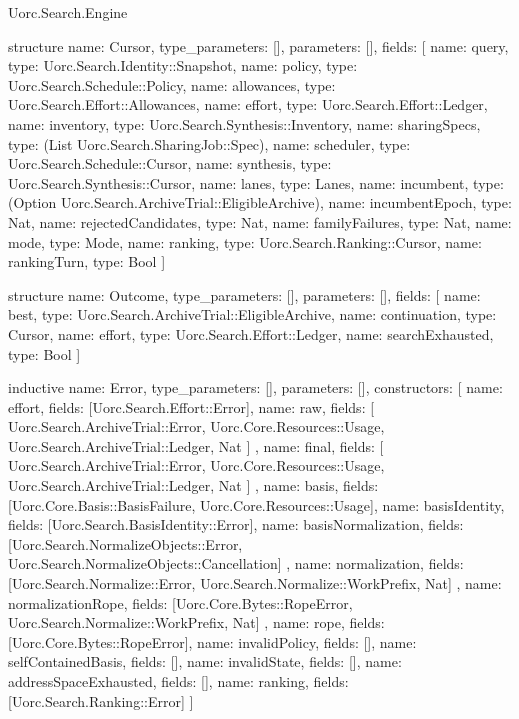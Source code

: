 \begin{lexlean}{Uorc.Search.Engine}
\begin{semanticmodule}
structure{
  name: Cursor,
  type_parameters: [],
  parameters: [],
  fields: [
    {name: query, type: Uorc.Search.Identity::Snapshot},
    {name: policy, type: Uorc.Search.Schedule::Policy},
    {name: allowances, type: Uorc.Search.Effort::Allowances},
    {name: effort, type: Uorc.Search.Effort::Ledger},
    {name: inventory, type: Uorc.Search.Synthesis::Inventory},
    {name: sharingSpecs, type: (List Uorc.Search.SharingJob::Spec)},
    {name: scheduler, type: Uorc.Search.Schedule::Cursor},
    {name: synthesis, type: Uorc.Search.Synthesis::Cursor},
    {name: lanes, type: Lanes},
    {name: incumbent, type: (Option Uorc.Search.ArchiveTrial::EligibleArchive)},
    {name: incumbentEpoch, type: Nat},
    {name: rejectedCandidates, type: Nat},
    {name: familyFailures, type: Nat},
    {name: mode, type: Mode},
    {name: ranking, type: Uorc.Search.Ranking::Cursor},
    {name: rankingTurn, type: Bool}
  ]
}

structure{
  name: Outcome,
  type_parameters: [],
  parameters: [],
  fields: [
    {name: best, type: Uorc.Search.ArchiveTrial::EligibleArchive},
    {name: continuation, type: Cursor},
    {name: effort, type: Uorc.Search.Effort::Ledger},
    {name: searchExhausted, type: Bool}
  ]
}

inductive{
  name: Error,
  type_parameters: [],
  parameters: [],
  constructors: [
    {name: effort, fields: [Uorc.Search.Effort::Error]},
    {
      name: raw,
      fields: [
        Uorc.Search.ArchiveTrial::Error,
        Uorc.Core.Resources::Usage,
        Uorc.Search.ArchiveTrial::Ledger,
        Nat
      ]
    },
    {
      name: final,
      fields: [
        Uorc.Search.ArchiveTrial::Error,
        Uorc.Core.Resources::Usage,
        Uorc.Search.ArchiveTrial::Ledger,
        Nat
      ]
    },
    {name: basis, fields: [Uorc.Core.Basis::BasisFailure, Uorc.Core.Resources::Usage]},
    {name: basisIdentity, fields: [Uorc.Search.BasisIdentity::Error]},
    {
      name: basisNormalization,
      fields: [Uorc.Search.NormalizeObjects::Error, Uorc.Search.NormalizeObjects::Cancellation]
    },
    {
      name: normalization,
      fields: [Uorc.Search.Normalize::Error, Uorc.Search.Normalize::WorkPrefix, Nat]
    },
    {
      name: normalizationRope,
      fields: [Uorc.Core.Bytes::RopeError, Uorc.Search.Normalize::WorkPrefix, Nat]
    },
    {name: rope, fields: [Uorc.Core.Bytes::RopeError]},
    {name: invalidPolicy, fields: []},
    {name: selfContainedBasis, fields: []},
    {name: invalidState, fields: []},
    {name: addressSpaceExhausted, fields: []},
    {name: ranking, fields: [Uorc.Search.Ranking::Error]}
  ]
}


\end{semanticmodule}
\end{lexlean}
